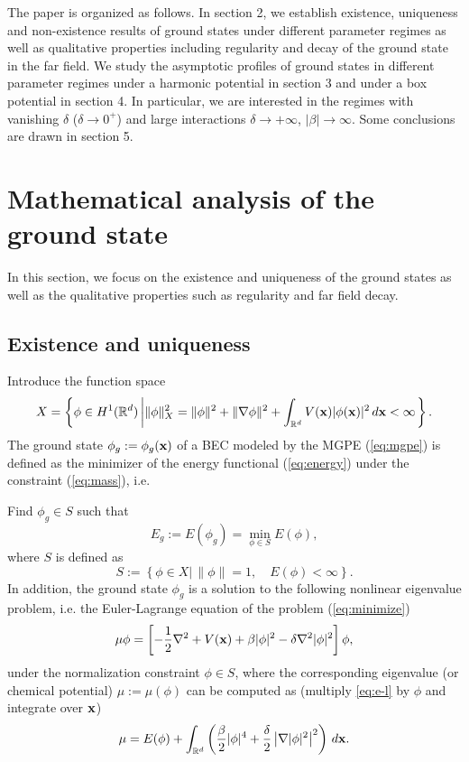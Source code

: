 \documentclass{elsarticle}
\newcommand{\be}{\begin{equation}}
\newcommand{\ee}{\end{equation}}
\newcommand{\bx}{{\bf x} }
\begin{document}
 The paper is organized as follows. In section 2, we
establish existence, uniqueness and non-existence
results of ground states under different parameter regimes as well as qualitative properties including regularity and decay of the ground state in the far field.
We study the asymptotic profiles of ground states in different parameter regimes under a harmonic potential in section 3 and under a box  potential in section 4. In particular, we are interested in the regimes with vanishing $\delta$ ($\delta\to0^+$) and large interactions $\delta\to+\infty$, $|\beta|\to\infty$.
 Some conclusions are drawn in section 5.




\section{Mathematical analysis of the ground state}
In this section, we focus on the existence and uniqueness of the ground states as well as the qualitative properties such as regularity and far field decay.
\subsection{Existence and uniqueness}
\label{s2} \setcounter{equation}{0}
Introduce the function space
\begin{equation*}
X=\left\{\phi\in H^1(\mathbb R^d)\left| \|\phi\|_X^2=
\|\phi\|^2+\|\nabla\phi\|^2+\int_{\mathbb R^d}V(\bx)|\phi(\bx)|^2\,d\bx<\infty\right.\right\}.
\end{equation*}
The ground state $\phi_g:=\phi_g(\bx)$ of
a BEC modeled by the MGPE (\ref{eq:mgpe})
is defined as the minimizer of the energy functional (\ref{eq:energy}) under the
constraint (\ref{eq:mass}), i.e.

  Find $\phi_g \in S$ such that
\begin{equation}\label{eq:minimize}
    E_g := E\left(\phi_g\right) = \min_{\phi \in S}
    E\left(\phi\right),
  \end{equation}
where $S$ is  defined as \be\label{eq:nonconset}
S:=\left\{\phi \in X| \,\|\phi\|=1,\quad E(\phi)<\infty\right\}.\ee
In addition, the ground state $\phi_g$ is a solution to the following nonlinear
eigenvalue problem, i.e. the Euler-Lagrange equation of the problem (\ref{eq:minimize})
\be\label{eq:e-l}
\mu \phi=\left[-\frac{1}{2}\nabla^2
+V(\bx)
+\beta|\phi|^2-\delta\nabla^2|\phi|^2\right]\phi,
 \ee
under the normalization constraint $\phi\in S$, where the corresponding eigenvalue (or chemical potential)  $\mu:=\mu(\phi)$ can be computed as
 (multiply \eqref{eq:e-l} by $\phi$ and integrate over $\bx$)
\be
\mu=E(\phi)+\int_{\mathbb R^d}\left(\frac{\beta}{2}|\phi|^4+\frac{\delta}{2}\left|\nabla|\phi|^2\right|^2
\right)\,d\bx.
\ee
\end{document}
